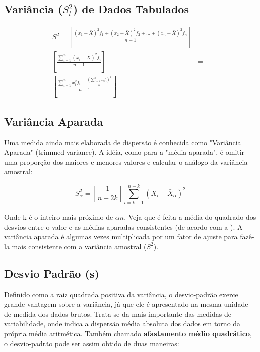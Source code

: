 \subsection{Variância ($S^{2}_{t}$) de Dados Tabulados}


\begin{eqnarray}\nonumber
S^{2} = \left[ \frac{(x_{1}-\bar{X})^{2}f_{1}+(x_{2}-\bar{X})^{2}f_{2}+\ldots+(x_{n}-\bar{X})^{2}f_{n}}{n-1} \right]
    & = &  \\
    \left[ \frac{\sum_{i=1}^{n}(x_{i}-\bar{X})^{2}f_{i}}{n-1} \right]  & = &  \\ \nonumber
    \left[ \frac{\sum_{i=1}^{n}x_{i}^{2}f_{i}-\frac{(\sum_{i=1}^{n}x_{i}f_{i})^{2}}{n}}{n-1} \right] &  &
\end{eqnarray}



\subsection{Variância Aparada}

Uma medida ainda mais elaborada de dispersão é conhecida como "Variância Aparada" (trimmed variance). A idéia, como para a "média aparada", é omitir uma proporção dos maiores e menores valores e calcular o análogo da variância amostral:

\begin{equation}\label{varAparada}
    S_{\alpha}^{2} = \left[\frac{1}{n-2k}\right]\sum_{i=k+1}^{n-k}(X_{i}-\bar{X}_{\alpha})^{2}
\end{equation}


Onde k é o inteiro mais próximo de $\alpha n$. Veja que é feita a média do quadrado dos desvios entre o valor e as médias aparadas consistentes (de acordo com a \label{aparada}). A variância aparada é algumas vezes multiplicada por um fator de ajuste para fazê-la mais consistente com a variância amostral ($S^{2}$).


\subsection{Desvio Padrão (s)}

Definido como a raiz quadrada positiva da variância, o desvio-padrão exerce grande vantagem sobre a variância, já que ele é apresentado na mesma unidade de medida dos dados brutos. Trata-se da mais importante das medidas de variabilidade, onde indica a dispersão média absoluta dos dados em torno da própria média aritmética. Também chamado \textbf{afastamento médio quadrático}, o desvio-padrão pode ser assim obtido de duas maneiras:\vskip0.3cm

